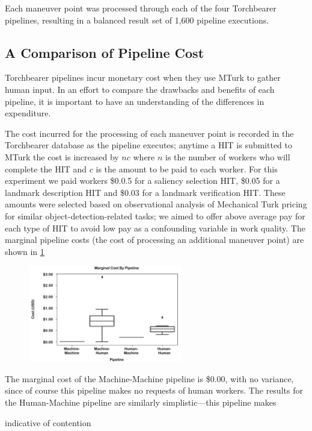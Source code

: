 Each maneuver point was processed through each of the four Torchbearer pipelines, resulting in a balanced result set of 1,600 pipeline executions.

\subsection{A Comparison of Pipeline Cost}

Torchbearer pipelines incur monetary cost when they use MTurk to gather human input. In an effort to compare the drawbacks and benefits of each pipeline, it is important to have an understanding of the differences in expenditure.

The cost incurred for the processing of each maneuver point is recorded in the Torchbearer database as the pipeline executes; anytime a HIT is submitted to MTurk the cost is increased by $nc$ where $n$ is the number of workers who will complete the HIT and $c$ is the amount to be paid to each worker. For this experiment we paid workers \$0.0.5 for a saliency selection HIT, \$0.05 for a landmark description HIT and \$0.03 for a landmark verification HIT. These amounts were selected based on observational analysis of Mechanical Turk pricing for similar object-detection-related tasks; we aimed to offer above average pay for each type of HIT to avoid low pay as a confounding variable in work quality. The marginal pipeline costs (the cost of processing an additional maneuver point) are shown in \ref{fig:plot:cost}

\begin{figure}[htbp]
  \centering
  \includegraphics[width=0.6\textwidth]{images/plot_cost.pdf}
  \label{fig:plot:cost}
\end{figure}

The marginal cost of the Machine-Machine pipeline is \$0.00, with no variance, since of course this pipeline makes no requests of human workers. The results for the Human-Machine pipeline are similarly simplistic---this pipeline makes 


indicative of contention